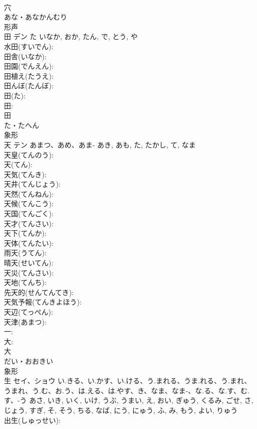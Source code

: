 \documentclass[8pt]{extreport}
\begin{document}
\begin{CJK}{UTF8}{min}
\\	穴	
\\	あな・あなかんむり	
\\	形声 
\\	田	デン	た	いなか, おか, たん, で, とう, や	
\\	水田(すいでん): 
\\	田舎(いなか): 
\\	田園(でんえん): 
\\	田植え(たうえ): 
\\	田んぼ(たんぼ): 
\\	田(た): 
\\	田: 
\\	田	
\\	た・たへん	
\\	象形 
\\	天	テン	あまつ、あめ、あま-	あき, あも, た, たかし, て, なま	
\\	天皇(てんのう): 
\\	天(てん): 
\\	天気(てんき): 
\\	天井(てんじょう): 
\\	天然(てんねん): 
\\	天候(てんこう): 
\\	天国(てんごく): 
\\	天才(てんさい): 
\\	天下(てんか): 
\\	天体(てんたい): 
\\	雨天(うてん): 
\\	晴天(せいてん): 
\\	天災(てんさい): 
\\	天地(てんち): 
\\	先天的(せんてんてき): 
\\	天気予報(てんきよほう): 
\\	天辺(てっぺん): 
\\	天津(あまつ): 
\\	一: 
\\	大: 
\\	大	
\\	だい・おおきい	
\\	象形 
\\	生	セイ、ショウ	い.きる、い.かす、い.ける、う.まれる、うま.れる、う.まれ、うまれ、う.む、お.う、は.える、は.やす、き、なま、なま-、な.る、な.す、む.す、-う	あさ, いき, いく, いけ, うぶ, うまい, え, おい, ぎゅう, くるみ, ごせ, さ, じょう, すぎ, そ, そう, ちる, なば, にう, にゅう, ふ, み, もう, よい, りゅう	
\\	出生(しゅっせい): 

\end{CJK}
\end{document}

